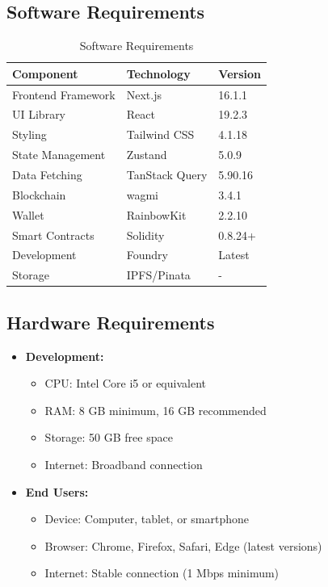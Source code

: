 \subsection{Software Requirements}

\begin{table}[H]
\centering
\caption{Software Requirements}
\begin{tabular}{|l|l|l|}
\hline
\textbf{Component} & \textbf{Technology} & \textbf{Version} \\
\hline
Frontend Framework & Next.js & 16.1.1 \\
\hline
UI Library & React & 19.2.3 \\
\hline
Styling & Tailwind CSS & 4.1.18 \\
\hline
State Management & Zustand & 5.0.9 \\
\hline
Data Fetching & TanStack Query & 5.90.16 \\
\hline
Blockchain & wagmi & 3.4.1 \\
\hline
Wallet & RainbowKit & 2.2.10 \\
\hline
Smart Contracts & Solidity & 0.8.24+ \\
\hline
Development & Foundry & Latest \\
\hline
Storage & IPFS/Pinata & - \\
\hline
\end{tabular}
\end{table}

\subsection{Hardware Requirements}

\begin{itemize}
    \item \textbf{Development:} 
    \begin{itemize}
        \item CPU: Intel Core i5 or equivalent
        \item RAM: 8 GB minimum, 16 GB recommended
        \item Storage: 50 GB free space
        \item Internet: Broadband connection
    \end{itemize}
    \item \textbf{End Users:}
    \begin{itemize}
        \item Device: Computer, tablet, or smartphone
        \item Browser: Chrome, Firefox, Safari, Edge (latest versions)
        \item Internet: Stable connection (1 Mbps minimum)
    \end{itemize}
\end{itemize}

